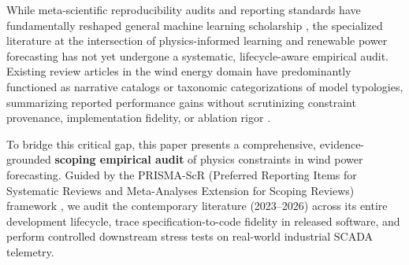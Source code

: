 \documentclass[preprint,3p,times]{elsarticle}
\begin{document}
While meta-scientific reproducibility audits and reporting standards have fundamentally reshaped general machine learning scholarship \cite{pineau2021,gundersen2018,damour2022,lipton2019}, the specialized literature at the intersection of physics-informed learning and renewable power forecasting has not yet undergone a systematic, lifecycle-aware empirical audit. Existing review articles in the wind energy domain have predominantly functioned as narrative catalogs or taxonomic categorizations of model typologies, summarizing reported performance gains without scrutinizing constraint provenance, implementation fidelity, or ablation rigor \cite{maldonadocorrea2020slr}. 

To bridge this critical gap, this paper presents a comprehensive, evidence-grounded \textbf{scoping empirical audit} of physics constraints in wind power forecasting. Guided by the PRISMA-ScR (Preferred Reporting Items for Systematic Reviews and Meta-Analyses Extension for Scoping Reviews) framework \cite{tricco2018,levac2010}, we audit the contemporary literature (2023--2026) across its entire development lifecycle, trace specification-to-code fidelity in released software, and perform controlled downstream stress tests on real-world industrial SCADA telemetry.
\end{document}
